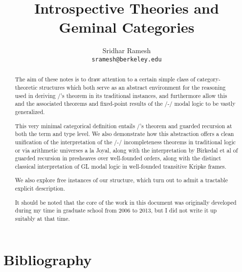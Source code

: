 \documentclass[12pt]{article}
\title{Introspective Theories and Geminal Categories}
\author{
  Sridhar Ramesh\\
  \texttt{sramesh@berkeley.edu}
}
\begin{document}
\maketitle

\begin{abstract}

The aim of these notes is to draw attention to a certain simple class of category-theoretic structures which both serve as an abstract environment for the reasoning used in deriving \Loeb/'s theorem in its traditional instances, and furthermore allow this and the associated theorems and fixed-point results of the \Goedel/-\Loeb/ modal logic to be vastly generalized.

This very minimal categorical definition entails \Loeb/'s theorem and guarded recursion at both the term and type level. We also demonstrate how this abstraction offers a clean unification of the interpretation of the \Godel/-\Lob/ incompleteness theorems in traditional logic or via arithmetic universes a la Joyal, along with the interpretation by Birkedal et al of guarded recursion in presheaves over well-founded orders, along with the distinct classical interpretation of GL modal logic in well-founded transitive Kripke frames.

We also explore free instances of our structure, which turn out to admit a tractable explicit description.

It should be noted that the core of the work in this document was originally developed during my time in graduate school from 2006 to 2013, but I did not write it up suitably at that time.
\end{abstract}

\newpage
\tableofcontents

\newpage
\setcounter{section}{-1}
\setcounter{page}{1}











\newpage
\section{Bibliography}
\printbibliography

\printindex
\end{document}
